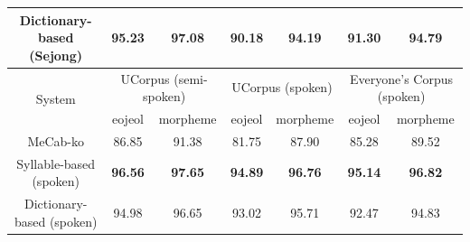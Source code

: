 \documentclass[AMS,STIX2COL]{WileyNJD-v2}
\begin{document}
\begin{table}[ht]
\begin{tabular*}{500pt}{@{\extracolsep\fill}c|cccccc@{\extracolsep\fill}}
            \hspace{2mm}Dictionary-based (Sejong)  & \textbf{95.23}             & \textbf{97.08}               & 90.18                      & 94.19                        & 91.30                      & 94.79                        \\
            \toprule
            \multirow{2}{*}{System}                & \multicolumn{2}{c}{UCorpus (semi-spoken)}                 & \multicolumn{2}{c}{UCorpus (spoken)}                      & \multicolumn{2}{c}{Everyone's Corpus (spoken)}            \\
            \cmidrule{2-3} \cmidrule{4-5} \cmidrule{6-7}
            ~                                      & \multicolumn{1}{c}{eojeol} & \multicolumn{1}{c}{morpheme} & \multicolumn{1}{c}{eojeol} & \multicolumn{1}{c}{morpheme} & \multicolumn{1}{c}{eojeol} & \multicolumn{1}{c}{morpheme} \\
            \midrule
            \hspace{2mm}MeCab-ko                   & 86.85                      & 91.38                        & 81.75                      & 87.90                        & 85.28                      & 89.52                        \\
            \hspace{2mm}Syllable-based (spoken)    & \textbf{96.56}             & \textbf{97.65}               & \textbf{94.89}             & \textbf{96.76}               & \textbf{95.14}             & \textbf{96.82}               \\
            \hspace{2mm}Dictionary-based (spoken)  & 94.98                      & 96.65                        & 93.02                      & 95.71                        & 92.47                      & 94.83                        \\
            \bottomrule
        \end{tabular*}
    \end{table}
\end{document}
